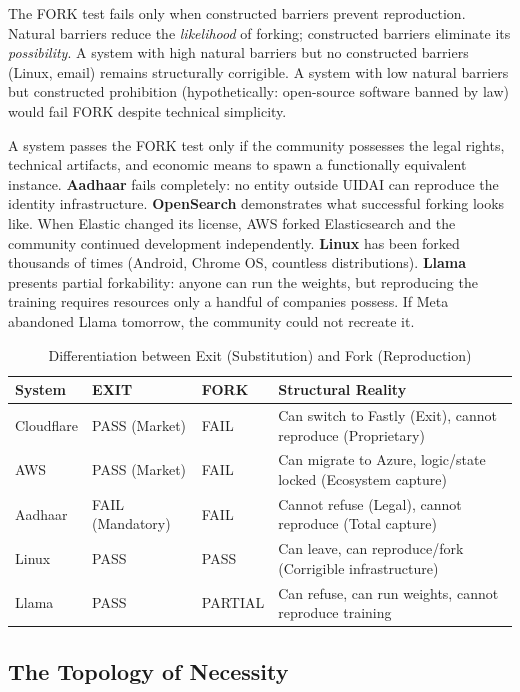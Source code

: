 The FORK test fails only when constructed barriers prevent reproduction. Natural barriers reduce the \textit{likelihood} of forking; constructed barriers eliminate its \textit{possibility}. A system with high natural barriers but no constructed barriers (Linux, email) remains structurally corrigible. A system with low natural barriers but constructed prohibition (hypothetically: open-source software banned by law) would fail FORK despite technical simplicity.

A system passes the FORK test only if the community possesses the legal rights, technical artifacts, and economic means to spawn a functionally equivalent instance. \textbf{Aadhaar} fails completely: no entity outside UIDAI can reproduce the identity infrastructure. \textbf{OpenSearch} demonstrates what successful forking looks like. When Elastic changed its license, AWS forked Elasticsearch and the community continued development independently. \textbf{Linux} has been forked thousands of times (Android, Chrome OS, countless distributions). \textbf{Llama} presents partial forkability: anyone can run the weights, but reproducing the training requires resources only a handful of companies possess. If Meta abandoned Llama tomorrow, the community could not recreate it.

\begin{table}[htbp]
\centering
\begin{tabular}{@{}llll@{}}
\toprule
\textbf{System} & \textbf{EXIT} & \textbf{FORK} & \textbf{Structural Reality} \\
\midrule
Cloudflare & PASS (Market) & FAIL & Can switch to Fastly (Exit), cannot reproduce (Proprietary) \\
AWS & PASS (Market) & FAIL & Can migrate to Azure, logic/state locked (Ecosystem capture) \\
Aadhaar & FAIL (Mandatory) & FAIL & Cannot refuse (Legal), cannot reproduce (Total capture) \\
Linux & PASS & PASS & Can leave, can reproduce/fork (Corrigible infrastructure) \\
Llama & PASS & PARTIAL & Can refuse, can run weights, cannot reproduce training \\
\bottomrule
\end{tabular}
\caption{Differentiation between Exit (Substitution) and Fork (Reproduction)}
\end{table}

\subsection{The Topology of Necessity}

